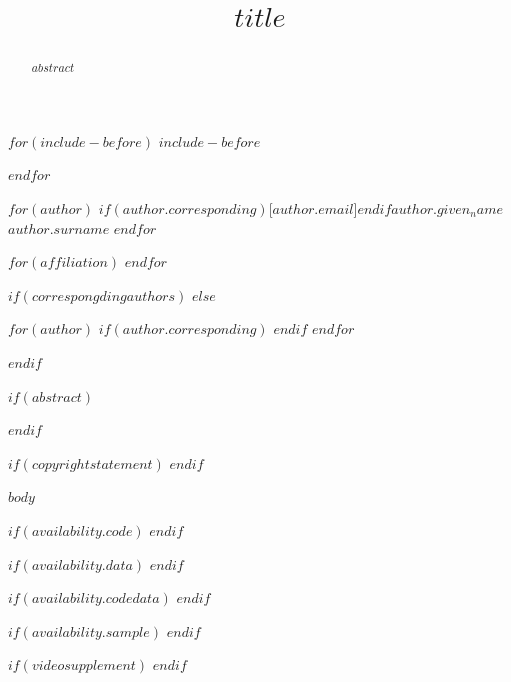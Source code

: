 \documentclass[$journal$, manuscript, $language$]{copernicus}
\begin{document}
$for(include-before)$
$include-before$

$endfor$

\title{$title$}


$for(author)$
$if(author.corresponding)$[$author.email$]$endif${$author.given_name$}{$author.surname$}
$endfor$


$for(affiliation)$
$endfor$



$if(correspongdingauthors)$
$else$

$for(author)$
$if(author.corresponding)$
$endif$
$endfor$

$endif$


\received{}
\pubdiscuss{} %
\revised{}
\accepted{}
\published{}




\maketitle


$if(abstract)$
\begin{abstract}
$abstract$
\end{abstract}
$endif$


$if(copyrightstatement)$
$endif$


$body$

$if(availability.code)$
$endif$

$if(availability.data)$
$endif$

$if(availability.codedata)$
$endif$

$if(availability.sample)$
$endif$

$if(videosupplement)$
$endif$
\end{document}
